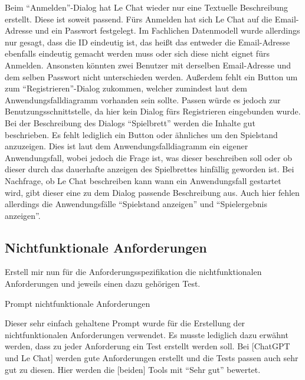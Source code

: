 Beim ``Anmelden''-Dialog hat Le Chat wieder nur eine Textuelle Beschreibung erstellt. Diese ist soweit passend. Fürs Anmelden hat sich Le Chat auf die 
Email-Adresse und ein Passwort festgelegt. Im Fachlichen Datenmodell wurde allerdings nur gesagt, dass die ID eindeutig ist, das heißt das entweder 
die Email-Adresse ebenfalls eindeutig gemacht werden muss oder sich diese nicht eignet fürs Anmelden. Ansonsten könnten zwei Benutzer mit derselben
Email-Adresse und dem selben Passwort nicht unterschieden werden. Außerdem fehlt ein Button um zum ``Registrieren''-Dialog zukommen, welcher zumindest
laut dem Anwendungsfalldiagramm vorhanden sein sollte. Passen würde es jedoch zur Benutzungsschnittstelle, da hier kein Dialog fürs Registrieren
eingebunden wurde.\\
Bei der Beschreibung des Dialogs ``Spielbrett'' werden die Inhalte gut beschrieben. Es fehlt lediglich ein Button oder ähnliches um den Spielstand 
anzuzeigen. Dies ist laut dem Anwendungsfalldiagramm ein eigener Anwendungsfall, wobei jedoch die Frage ist, was dieser beschreiben soll oder ob dieser
durch das dauerhafte anzeigen des Spielbrettes hinfällig geworden ist. Bei Nachfrage, ob Le Chat beschreiben kann wann ein Anwendungsfall gestartet wird,
gibt dieser eine zu dem Dialog passende Beschreibung aus. Auch hier fehlen allerdings die Anwendungsfälle ``Spielstand anzeigen'' und ``Spielergebnis anzeigen''.\\


\subsection*{Nichtfunktionale Anforderungen}

\begin{prompt}[H]
    \begin{tcolorbox}[colback=gray!20, colframe=gray!20, boxrule=0pt, sharp corners] 
        Erstell mir nun für die Anforderungsspezifikation die nichtfunktionalen Anforderungen und jeweils einen dazu gehörigen Test.
        \vfill
    \end{tcolorbox}
    \caption{Prompt nichtfunktionale Anforderungen}
    \label{Prompt nichtfunktionale Anforderungen}
\end{prompt}

Dieser sehr einfach gehaltene Prompt wurde für die Erstellung der nichtfunktionalen Anforderungen verwendet. Es musste lediglich dazu erwähnt werden,
dass zu jeder Anforderung ein Test erstellt werden soll. Bei [ChatGPT und Le Chat] werden gute Anforderungen erstellt und die Tests passen auch 
sehr gut zu diesen. Hier werden die [beiden] Tools mit ``Sehr gut'' bewertet.

